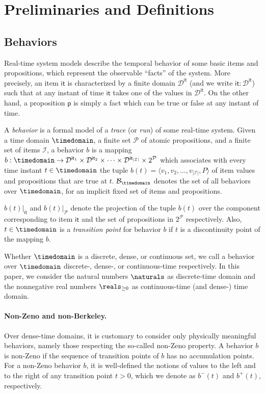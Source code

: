 \documentclass[a4paper]{article}
\newcommand{\pp}{\mathsf{p}}
\newcommand{\Ical}{\mathcal{I}}
\newcommand{\Pcal}{\mathcal{P}}
\newcommand{\Dcal}{\mathcal{D}}
\newcommand{\behav}{\mathcal{B}}
\newcommand{\iit}{\mathsf{it}}
\newcommand{\IIT}{\Ical}
\theoremstyle{plain}
\theoremstyle{definition}
\begin{document}
\section{Preliminaries and Definitions} \label{sec:preliminaries}

\subsection{Behaviors}
Real-time system models describe the temporal behavior of some basic items and propositions, which represent the observable ``facts'' of the system.
More precisely, an item $\iit$ is characterized by a finite domain $\Dcal^{\iit}$ (and we write $\iit: \Dcal^{\iit}$) such that at any instant of time $\iit$ takes one of the values in $\Dcal^{\iit}$.
On the other hand, a proposition $\pp$ is simply a fact which can be true or false at any instant of time.

A \emph{behavior} is a formal model of a \emph{trace} (or \emph{run}) of some real-time system.
Given a time domain $\timedomain$, a finite set $\Pcal$ of atomic propositions, and a finite set of items $\IIT$, a behavior $b$ is a mapping $b: \timedomain \rightarrow \Dcal^{\iit_1}\times \Dcal^{\iit_2} \times \cdots \times \Dcal^{\iit_{|\IIT|}} \times 2^\Pcal$ which associates with every time instant $t \in \timedomain$ the tuple $b(t) = \langle v_1, v_2, \ldots, v_{|\IIT|}, P \rangle$ of item values and propositions that are true at $t$.
$\behav_{\timedomain}$ denotes the set of all behaviors over $\timedomain$, for an implicit fixed set of items and propositions.

$b(t)|_{\iit}$ and $b(t)|_{\Pcal}$ denote the projection of the tuple $b(t)$ over the component corresponding to item $\iit$ and the set of propositions in $2^\Pcal$ respectively.
Also, $t \in \timedomain$ is a \emph{transition point} for behavior $b$ if $t$ is a discontinuity point of the mapping $b$.

Whether $\timedomain$ is a discrete, dense, or continuous set, we call a behavior over $\timedomain$ discrete-, dense-, or continuous-time respectively.
In this paper, we consider the natural numbers $\naturals$ as discrete-time domain and the nonnegative real numbers $\reals_{\geq 0}$ as continuous-time (and dense-) time domain.




\paragraph{Non-Zeno and non-Berkeley.}
Over dense-time domains, it is customary to consider only physically meaningful behaviors, namely those respecting the so-called non-Zeno property.
A behavior $b$ is non-Zeno if the sequence of transition points of $b$ has no accumulation points.
For a non-Zeno behavior $b$, it is well-defined the notions of values to the left and to the right of any transition point $t > 0$, which we denote as $b^-(t)$ and $b^+(t)$, respectively.
\end{document}
